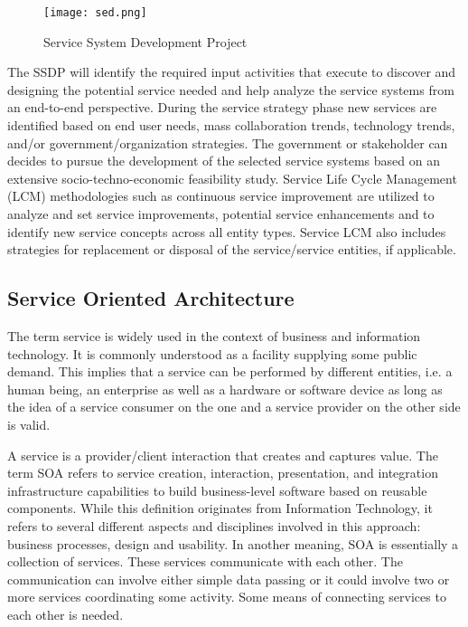 \begin{figure}[H]
    \begin{center}
    \texttt{[image: sed.png]}
        \caption{Service System Development Project\cite{Lopes2013}}
        \label{fig:SSDP}
    \end{center}
\end{figure}

The SSDP will identify the required input activities that execute to discover and designing the potential service needed and help analyze the service systems from an end-to-end perspective. During the service strategy phase new services are identified based on end user needs, mass collaboration trends, technology trends, and/or government/organization strategies. The government or stakeholder can decides to pursue the development of the selected service systems based on an extensive socio-techno-economic feasibility study. Service Life Cycle Management (LCM) methodologies such as continuous service improvement are utilized to analyze and set service improvements, potential service enhancements and to identify new service concepts across all entity types. Service LCM also includes strategies for replacement or disposal of the service/service entities, if applicable.\par

\subsection{Service Oriented Architecture}
The term service is widely used in the context of business and information technology. It is commonly understood as a facility supplying some public demand\cite{Haubrock2007}. This implies that a service can be performed by different entities, i.e. a human being, an enterprise as well as a hardware or software device as long as the idea of a service consumer on the one and a service provider on the other side is valid.\par
A service is a provider/client interaction that creates and captures value\cite{Haubrock2007}. The term SOA refers to service creation, interaction, presentation, and integration infrastructure capabilities to build business-level software based on reusable components. While this definition originates from Information Technology, it refers to several different aspects and disciplines involved in this approach: business processes, design and usability. In another meaning, SOA is essentially a collection of services. These services communicate with each other. The communication can involve either simple data passing or it could involve two or more services coordinating some activity. Some means of connecting services to each other is needed\cite{DefinisiSOA}.\par

